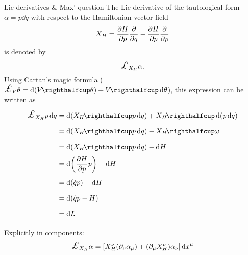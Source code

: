 \begin{mathbox}{Lie derivatives \& Max' question}
    The Lie derivative of the tautological form $\alpha = p\dd{q}$ with respect to the
    Hamiltonian vector field
    $$ X_H = \pdv{H}{p}\pdv{}{q} - \pdv{H}{p}\pdv{}{p}$$
    is denoted by
    $$ \lied{X_H}{\alpha}.$$
    Using Cartan's magic formula ($ \lied{V}{\theta} = \dd{(\intpr{V}{\theta})} + \intpr{V}{\dd{\theta}}$), this expression
    can be written as
    \begin{equation*} 
        \begin{split}
            \lied{X_H}{p\dd{q}} &= \dd{(\intpr{X_H}{p\dd{q}})} + \intpr{X_H}{\dd{(p\dd{q})}} \\
                                &= \dd{(\intpr{X_H}{p\dd{q}})} - \intpr{X_H}{\omega} \\
                                &= \dd{(\intpr{X_H}{p\dd{q}})} - \dd{H} \\
                                &= \dd{\qty(\pdv{H}{p}p)} - \dd{H} \\
                                &= \dd{(\dot{q}p)} - \dd{H} \\
                                &= \dd{(\dot{q}p - H)} \\
                                &= \dd{L} \\
        \end{split}
    \end{equation*}

    Explicitly in components:
    \begin{equation*}
        \lied{X_H}{\alpha} = \qty[X_H^{\nu}(\partial_{\nu}\alpha_{\mu}) + (\partial_{\mu} X_H^{\nu})\alpha_{\nu}]\dd{x}^{\mu}
    \end{equation*}


\end{mathbox}
